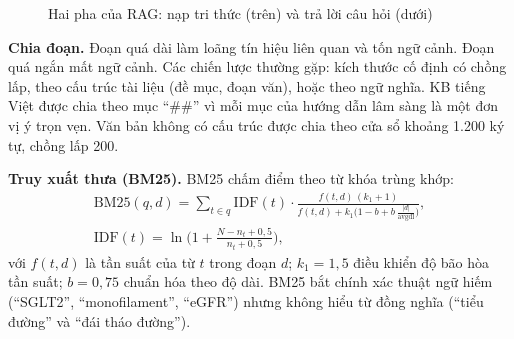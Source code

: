 \begin{figure}[H]
\centering
{}
\caption{Hai pha của RAG: nạp tri thức (trên) và trả lời câu hỏi (dưới)}
\label{fig:ch5-pipeline}
\end{figure}

\textbf{Chia đoạn.} Đoạn quá dài làm loãng tín hiệu liên quan và tốn ngữ cảnh. Đoạn quá ngắn mất ngữ cảnh. Các chiến lược thường gặp: kích thước cố định có chồng lấp, theo cấu trúc tài liệu (đề mục, đoạn văn), hoặc theo ngữ nghĩa. KB tiếng Việt được chia theo mục ``\#\#'' vì mỗi mục của hướng dẫn lâm sàng là một đơn vị ý trọn vẹn. Văn bản không có cấu trúc được chia theo cửa sổ khoảng 1.200 ký tự, chồng lấp 200.

\textbf{Truy xuất thưa (BM25).} BM25 \cite{robertson2009} chấm điểm theo từ khóa trùng khớp:
\begin{equation}
\begin{gathered}
\mathrm{BM25}(q,d) = \sum_{t\in q}\mathrm{IDF}(t)\cdot\frac{f(t,d)\,(k_1+1)}{f(t,d)+k_1\big(1-b+b\,\frac{|d|}{\mathrm{avgdl}}\big)}, \\
\mathrm{IDF}(t)=\ln\!\Big(1+\frac{N-n_t+0{,}5}{n_t+0{,}5}\Big),
\end{gathered}
\label{eq:bm25}
\end{equation}
với $f(t,d)$ là tần suất của từ $t$ trong đoạn $d$; $k_1=1{,}5$ điều khiển độ bão hòa tần suất; $b=0{,}75$ chuẩn hóa theo độ dài. BM25 bắt chính xác thuật ngữ hiếm (``SGLT2'', ``monofilament'', ``eGFR'') nhưng không hiểu từ đồng nghĩa (``tiểu đường'' và ``đái tháo đường'').

